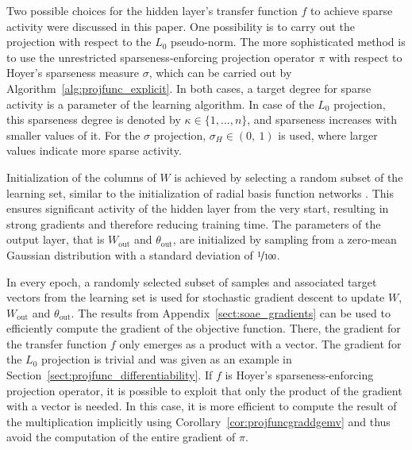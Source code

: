 \documentclass[twoside,11pt]{article}
\DeclareMathOperator{\out}{out}
\newcommand{\intervaloo}[2]{\left(#1,\ #2\right)}
\newcommand{\0}{\mathcal{O}}
\newcommand{\discint}[2]{\{#1,\dotsc,#2\}}
\newcommand{\inint}[2]{\in\discint{#1}{#2}}
\begin{document}
Two possible choices for the hidden layer's transfer function $f$ to achieve sparse activity were discussed in this paper.
One possibility is to carry out the projection with respect to the $L_0$ pseudo-norm.
The more sophisticated method is to use the unrestricted sparseness-enforcing projection operator $\pi$ with respect to Hoyer's sparseness measure $\sigma$, which can be carried out by Algorithm~\ref{alg:projfunc_explicit}.
In both cases, a target degree for sparse activity is a parameter of the learning algorithm.
In case of the $L_0$ projection, this sparseness degree is denoted by $\kappa\inint{1}{n}$, and sparseness increases with smaller values of it.
For the $\sigma$ projection, $\sigma_H\in\intervaloo{0}{1}$ is used, where larger values indicate more sparse activity.

Initialization of the columns of $W$ is achieved by selecting a random subset of the learning set, similar to the initialization of radial basis function networks \citep{Bishop1995}.
This ensures significant activity of the hidden layer from the very start, resulting in strong gradients and therefore reducing training time.
The parameters of the output layer, that is $W_{\out}$ and $\theta_{\out}$, are initialized by sampling from a zero-mean Gaussian distribution with a standard deviation of $\nicefrac{1}{100}$.

In every epoch, a randomly selected subset of samples and associated target vectors from the learning set is used for stochastic gradient descent to update $W$, $W_{\out}$ and $\theta_{\out}$.
The results from Appendix~\ref{sect:soae_gradients} can be used to efficiently compute the gradient of the objective function.
There, the gradient for the transfer function $f$ only emerges as a product with a vector.
The gradient for the $L_0$ projection is trivial and was given as an example in Section~\ref{sect:projfunc_differentiability}.
If $f$ is Hoyer's sparseness-enforcing projection operator, it is possible to exploit that only the product of the gradient with a vector is needed.
In this case, it is more efficient to compute the result of the multiplication implicitly using Corollary~\ref{cor:projfuncgraddgemv} and thus avoid the computation of the entire gradient of $\pi$.
\end{document}
